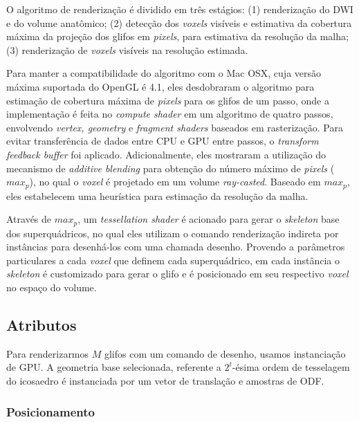 O algoritmo de renderização é dividido em três estágios: (1) renderização do DWI e do volume anatômico; (2) detecção dos \textit{voxels} visíveis e estimativa da cobertura máxima da projeção dos glifos em \textit{pixels}, para estimativa da resolução da malha; (3) renderização de \textit{voxels} visíveis na resolução estimada.

Para manter a compatibilidade do algoritmo com o Mac OSX, cuja versão máxima suportada do OpenGL é 4.1, eles desdobraram o algoritmo para estimação de cobertura máxima de \textit{pixels} para os glifos de um passo, onde a implementação é feita no \textit{compute shader} em um algoritmo de quatro passos, envolvendo \textit{vertex, geometry} e \textit{fragment shaders} baseados em rasterização. Para evitar transferência de dados entre CPU e GPU entre passos, o \textit{transform feedback buffer} foi aplicado. Adicionalmente, eles mostraram a utilização do mecanismo de \textit{additive blending} para obtenção do número máximo de \textit{pixels} ($max_p$), no qual o \textit{voxel} é projetado em um volume \textit{ray-casted}. Baseado em $max_p$, eles estabelecem uma heurística para estimação da resolução da malha.

Através de $max_p$, um \textit{tessellation shader} é acionado para gerar o \textit{skeleton} base dos superquádricos, no qual eles utilizam o comando renderização indireta por instâncias para desenhá-los com uma chamada desenho. Provendo a parâmetros particulares a cada \textit{voxel} que definem cada superquádrico, em cada instância o \textit{skeleton} é customizado para gerar o glifo e é posicionado em seu respectivo \textit{voxel} no espaço do volume.





\subsection{Atributos}
\label{ssec::atributos}



Para renderizarmos $M$ glifos com um comando de desenho, usamos instanciação de GPU. A geometria base selecionada, referente a $2^t$-ésima ordem de tesselagem do icosaedro é instanciada por um vetor de translação e amostras de ODF.

\subsubsection{Posicionamento}

